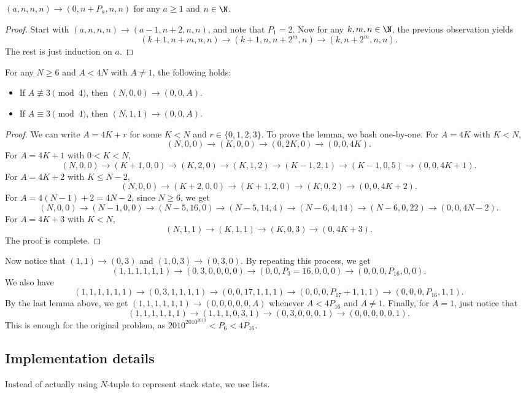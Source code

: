 \begin{lemma}
$(a, n, n, n) \to (0, n + P_a, n, n)$ for any $a \geq 1$ and $n \in \N$.
\end{lemma}
\begin{proof}
Start with $(a, n, n, n) \to (a - 1, n + 2, n, n)$, and note that $P_1 = 2$.
Now for any $k, m, n \in \N$, the previous observation yields
\[ (k + 1, n + m, n, n) \to (k + 1, n, n + 2^m, n) \to (k, n + 2^m, n, n). \]
The rest is just induction on $a$.
\end{proof}

\begin{lemma}
For any $N \geq 6$ and $A < 4N$ with $A \neq 1$, the following holds:
\begin{itemize}
    \item   If $A \not\equiv 3 \pmod{4}$, then $(N, 0, 0) \to (0, 0, A)$.
    \item   If $A \equiv 3 \pmod{4}$, then $(N, 1, 1) \to (0, 0, A)$.
\end{itemize}
\end{lemma}
\begin{proof}
We can write $A = 4K + r$ for some $K < N$ and $r \in \{0, 1, 2, 3\}$.
To prove the lemma, we bash one-by-one.
For $A = 4K$ with $K < N$,
\[ (N, 0, 0) \to (K, 0, 0) \to (0, 2K, 0) \to (0, 0, 4K). \]
For $A = 4K + 1$ with $0 < K < N$,
\[ (N, 0, 0) \to (K + 1, 0, 0) \to (K, 2, 0) \to (K, 1, 2) \to (K - 1, 2, 1) \to (K - 1, 0, 5) \to (0, 0, 4K + 1). \]
For $A = 4K + 2$ with $K \leq N - 2$,
\[ (N, 0, 0) \to (K + 2, 0, 0) \to (K + 1, 2, 0) \to (K, 0, 2) \to (0, 0, 4K + 2). \]
For $A = 4(N - 1) + 2 = 4N - 2$, since $N \geq 6$, we get
\[ (N, 0, 0) \to (N - 1, 0, 0) \to (N - 5, 16, 0) \to (N - 5, 14, 4) \to (N - 6, 4, 14) \to (N - 6, 0, 22) \to (0, 0, 4N - 2). \]
For $A = 4K + 3$ with $K < N$,
\[ (N, 1, 1) \to (K, 1, 1) \to (K, 0, 3) \to (0, 4K + 3). \]
The proof is complete.
\end{proof}

Now notice that $(1, 1) \to (0, 3)$ and $(1, 0, 3) \to (0, 3, 0)$.
By repeating this process, we get
\[ (1, 1, 1, 1, 1, 1) \to (0, 3, 0, 0, 0, 0) \to (0, 0, P_3 = 16, 0, 0, 0) \to (0, 0, 0, P_{16}, 0, 0). \]
We also have
\[ (1, 1, 1, 1, 1, 1) \to (0, 3, 1, 1, 1, 1) \to (0, 0, 17, 1, 1, 1) \to (0, 0, 0, P_{17} + 1, 1, 1) \to (0, 0, 0, P_{16}, 1, 1). \]
By the last lemma above, we get $(1, 1, 1, 1, 1, 1) \to (0, 0, 0, 0, 0, A)$ whenever $A < 4P_{16}$ and $A \neq 1$.
Finally, for $A = 1$, just notice that
\[ (1, 1, 1, 1, 1, 1) \to (1, 1, 1, 0, 3, 1) \to (0, 3, 0, 0, 0, 1) \to (0, 0, 0, 0, 0, 1). \]
This is enough for the original problem, as $2010^{2010^{2010}} < P_6 < 4P_{16}$.



\subsection*{Implementation details}

Instead of actually using $N$-tuple to represent stack state, we use lists.

